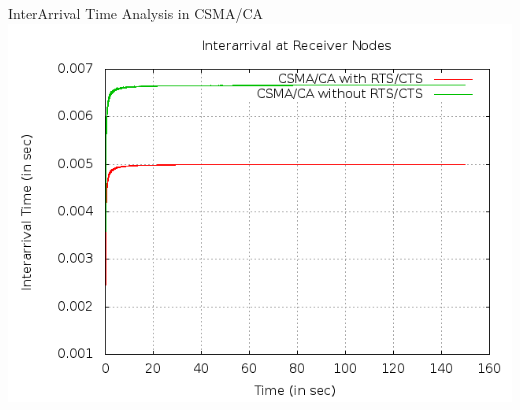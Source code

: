 \documentclass[a4paper,12pt]{report}
\begin{document}
\begin{center}
InterArrival Time Analysis in CSMA/CA
 \includegraphics[width=15 cm,height=13 cm]{./csma_interarrival.png}


\end{center}
\end{document}
